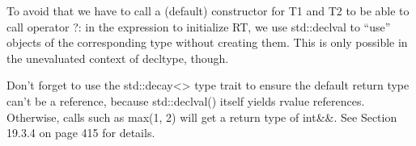 To avoid that we have to call a (default) constructor for T1 and T2 to be able to call operator ?: in the expression to initialize RT, we use std::declval to “use” objects of the corresponding type without creating them. This is only possible in the unevaluated context of decltype, though.

Don’t forget to use the std::decay<> type trait to ensure the default return type can’t be a reference, because std::declval() itself yields rvalue references. Otherwise, calls such as max(1, 2) will get a return type of int\&\&. See Section 19.3.4 on page 415 for details.






